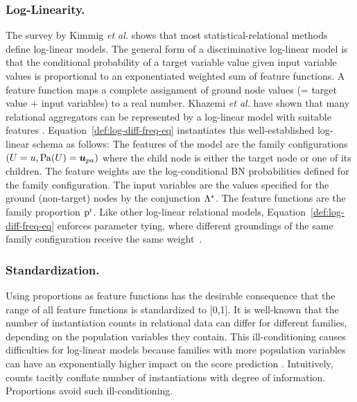 \documentclass[runningheads,a4paper]{llncs}
\begin{document}
\subsubsection{Log-Linearity.} The survey by Kimmig {\em et al.} \cite{Kimmig2014} shows that most statistical-relational methods define log-linear models. The general form of a discriminative log-linear model \cite{Sutton2007} is that the conditional probability of a target variable value given input variable values is proportional to an exponentiated weighted sum of feature functions. A feature function maps a complete assignment of ground node values (= target value + input variables) to a real number. Khazemi {\em et al.} have shown that many relational aggregators can be represented by a log-linear model with suitable features \cite{Kazemi2014}. 
Equation~\eqref{def:log-diff-freq-eq} instantiates this well-established log-linear schema as follows: The features of the model are the family configurations $(\Appendterm{\UT  = \UV} {\Pa{\UT} = \Prange{\UT}})$ 
where the child node is either the target node or one of its children. The feature weights are the log-conditional BN probabilities defined for the family configuration. The input variables are the values specified for the ground (non-target) nodes by the conjunction $\Lambda^{*}\hspace{0.0ex}$.
The feature functions are the family proportion $\mathrm{p}^{\mathrm{r}}$. Like other log-linear relational models, Equation~\ref{def:log-diff-freq-eq} enforces parameter tying, where different groundings of the same family configuration receive the same weight~\cite{Kimmig2014}. 

\subsubsection{Standardization.} Using proportions as feature functions has the desirable consequence that the range of all feature functions is standardized to [0,1]. It is well-known that the number of instantiation counts in relational data can differ for different families, depending on the population variables they contain. This ill-conditioning causes difficulties for log-linear models because families with more population variables can have an exponentially higher impact on the score prediction \cite{Lowd2007}. Intuitively, counts tacitly conflate number of instantiations with degree of information. Proportions avoid such ill-conditioning.
\end{document}
